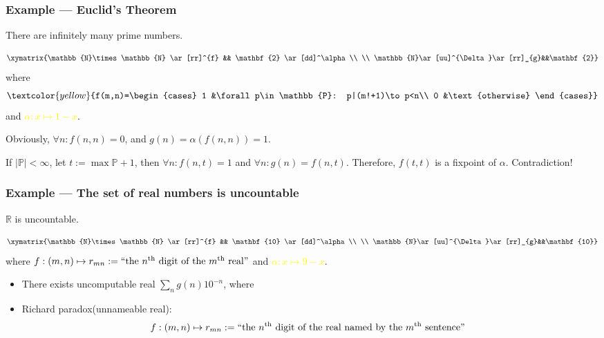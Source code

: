 \documentclass[UTF8,aspectratio=43,11pt,colorlinks,compress,openany]{beamer}%
\begin{document}
\begin{frame}\frametitle{Example --- Euclid's Theorem}\vspace{-1ex}
	\begin{theorem}
		There are infinitely many prime numbers.
	\end{theorem}\vspace{-2ex}
	\[\xymatrix{\mathbb{N}\times \mathbb{N}
		\ar[rr]^{f} && \mathbf{2} \ar[dd]^\alpha
		\\
		\\
		\mathbb{N}\ar[uu]^{\Delta}\ar[rr]_{g}&&\mathbf{2}}\]
	where 
	\[\textcolor{yellow}{f(m,n)=\begin{cases}
	1 &\forall p\in\mathbb{P}: p|(m!+1)\to p<n\\
	0 &\text{otherwise}
	\end{cases}}\]
	and \textcolor{yellow}{$\alpha: x\mapsto 1-x$}.
	
	Obviously, $\forall n: f(n,n)=0$, and $g(n)=\alpha(f(n,n))=1$.
	
	If $|\mathbb{P}|<\infty$, let $t:=\max\mathbb{P}+1$, then $\forall n: f(n,t)=1$ and $\forall n: g(n)=f(n,t)$. Therefore, $f(t,t)$ is a fixpoint of $\alpha$. Contradiction!
\end{frame}

\begin{frame}\frametitle{Example --- The set of real numbers is uncountable}
	\vspace{-7pt}
	\begin{theorem}[Cantor]
		$\mathbb{R}$ is uncountable.
	\end{theorem}
	\vspace{-7pt}
\setlength\abovedisplayskip{0pt}
\setlength\belowdisplayskip{0pt}
	\[\xymatrix{\mathbb{N}\times \mathbb{N}
		\ar[rr]^{f} && \mathbf{10} \ar[dd]^\alpha
		\\
		\\
		\mathbb{N}\ar[uu]^{\Delta}\ar[rr]_{g}&&\mathbf{10}}\]
	where \textcolor{yellow}{$f: (m,n)\mapsto r_{mn}:=\mbox{``the $n\textsuperscript{th}$ digit of the $m\textsuperscript{th}$ real''}$} and \textcolor{yellow}{$\alpha: x\mapsto 9-x$}.
	\begin{itemize}
		\item There exists uncomputable real $\sum_ng(n)10^{-n}$, where
		\resizebox{.95\textwidth}{!}{
			\begin{minipage}{\textwidth}
				\[f: (m,n)\mapsto r_{mn}:=
				\begin{cases}
				\mbox{the $n\textsuperscript{th}$ digit output by the $m\textsuperscript{th}$ Turing machine}\\
				0\;\; \mbox{if the $m\textsuperscript{th}$ Turing machine never outputs a $n\textsuperscript{th}$ digit}
				\end{cases}\]
		\end{minipage}}
		\item Richard paradox(unnameable real):
		\[\!\!\!\!f: (m,n)\mapsto r_{mn}:=\text{``the $n\textsuperscript{th}$ digit of the real named by the $m\textsuperscript{th}$ sentence''}\]
	\end{itemize}
\end{frame}
\end{document}

